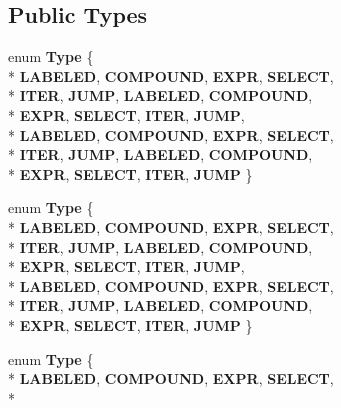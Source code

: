 \subsection*{Public Types}
\begin{DoxyCompactItemize}
\item 
enum {\bfseries Type} \{ \\*
{\bfseries L\-A\-B\-E\-L\-E\-D}, 
{\bfseries C\-O\-M\-P\-O\-U\-N\-D}, 
{\bfseries E\-X\-P\-R}, 
{\bfseries S\-E\-L\-E\-C\-T}, 
\\*
{\bfseries I\-T\-E\-R}, 
{\bfseries J\-U\-M\-P}, 
{\bfseries L\-A\-B\-E\-L\-E\-D}, 
{\bfseries C\-O\-M\-P\-O\-U\-N\-D}, 
\\*
{\bfseries E\-X\-P\-R}, 
{\bfseries S\-E\-L\-E\-C\-T}, 
{\bfseries I\-T\-E\-R}, 
{\bfseries J\-U\-M\-P}, 
\\*
{\bfseries L\-A\-B\-E\-L\-E\-D}, 
{\bfseries C\-O\-M\-P\-O\-U\-N\-D}, 
{\bfseries E\-X\-P\-R}, 
{\bfseries S\-E\-L\-E\-C\-T}, 
\\*
{\bfseries I\-T\-E\-R}, 
{\bfseries J\-U\-M\-P}, 
{\bfseries L\-A\-B\-E\-L\-E\-D}, 
{\bfseries C\-O\-M\-P\-O\-U\-N\-D}, 
\\*
{\bfseries E\-X\-P\-R}, 
{\bfseries S\-E\-L\-E\-C\-T}, 
{\bfseries I\-T\-E\-R}, 
{\bfseries J\-U\-M\-P}
 \}
\item 
enum {\bfseries Type} \{ \\*
{\bfseries L\-A\-B\-E\-L\-E\-D}, 
{\bfseries C\-O\-M\-P\-O\-U\-N\-D}, 
{\bfseries E\-X\-P\-R}, 
{\bfseries S\-E\-L\-E\-C\-T}, 
\\*
{\bfseries I\-T\-E\-R}, 
{\bfseries J\-U\-M\-P}, 
{\bfseries L\-A\-B\-E\-L\-E\-D}, 
{\bfseries C\-O\-M\-P\-O\-U\-N\-D}, 
\\*
{\bfseries E\-X\-P\-R}, 
{\bfseries S\-E\-L\-E\-C\-T}, 
{\bfseries I\-T\-E\-R}, 
{\bfseries J\-U\-M\-P}, 
\\*
{\bfseries L\-A\-B\-E\-L\-E\-D}, 
{\bfseries C\-O\-M\-P\-O\-U\-N\-D}, 
{\bfseries E\-X\-P\-R}, 
{\bfseries S\-E\-L\-E\-C\-T}, 
\\*
{\bfseries I\-T\-E\-R}, 
{\bfseries J\-U\-M\-P}, 
{\bfseries L\-A\-B\-E\-L\-E\-D}, 
{\bfseries C\-O\-M\-P\-O\-U\-N\-D}, 
\\*
{\bfseries E\-X\-P\-R}, 
{\bfseries S\-E\-L\-E\-C\-T}, 
{\bfseries I\-T\-E\-R}, 
{\bfseries J\-U\-M\-P}
 \}
\item 
enum {\bfseries Type} \{ \\*
{\bfseries L\-A\-B\-E\-L\-E\-D}, 
{\bfseries C\-O\-M\-P\-O\-U\-N\-D}, 
{\bfseries E\-X\-P\-R}, 
{\bfseries S\-E\-L\-E\-C\-T}, 
\\*

\end{DoxyCompactItemize}

